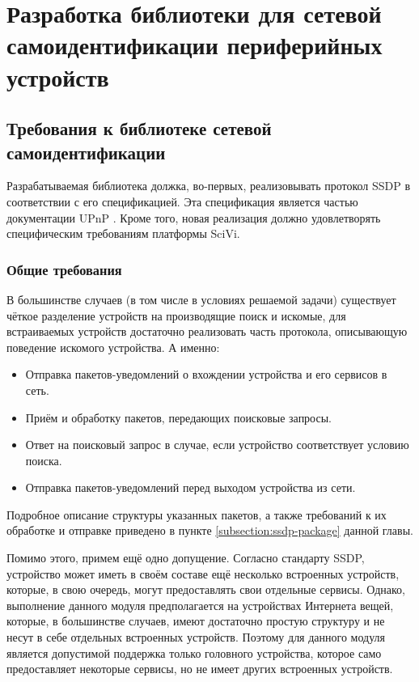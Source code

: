 \chapter{Разработка библиотеки для сетевой самоидентификации периферийных устройств}

\section{Требования к библиотеке сетевой самоидентификации}

Разрабатываемая библиотека должка, во-первых, реализовывать протокол SSDP в соответствии с его спецификацией.
Эта спецификация является частью документации UPnP \cite{web:upnp}.
Кроме того, новая реализация должно удовлетворять специфическим требованиям платформы SciVi.

\subsection{Общие требования}

В большинстве случаев (в том числе в условиях решаемой задачи) существует чёткое разделение устройств на производящие поиск и искомые, для встраиваемых устройств достаточно реализовать часть протокола, описывающую поведение искомого устройства.
А именно:
\begin{itemize}
	\item Отправка пакетов-уведомлений о вхождении устройства и его сервисов в сеть.
	\item Приём и обработку пакетов, передающих поисковые запросы.
	\item Ответ на поисковый запрос в случае, если устройство соответствует условию поиска.
	\item Отправка пакетов-уведомлений перед выходом устройства из сети.
\end{itemize}

Подробное описание структуры указанных пакетов, а также требований к их обработке и отправке приведено в пункте \ref{subsection:ssdp-package} данной главы.

Помимо этого, примем ещё одно допущение.
Согласно стандарту SSDP, устройство может иметь в своём составе ещё несколько встроенных устройств, которые, в свою очередь, могут предоставлять свои отдельные сервисы.
Однако, выполнение данного модуля предполагается на устройствах Интернета вещей, которые, в большинстве случаев, имеют достаточно простую структуру и не несут в себе отдельных встроенных устройств.
Поэтому для данного модуля является допустимой поддержка только головного устройства, которое само предоставляет некоторые сервисы, но не имеет других встроенных устройств.

